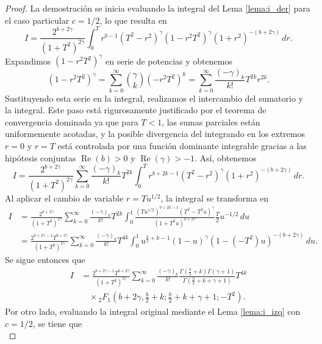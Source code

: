 \documentclass[12pt,a4paper]{book}
\begin{document}
\begin{proof}
La demostración se inicia evaluando la integral del Lema \ref{lema:i_der} para el caso particular $c = 1/2$, lo que resulta en
\[
    I = \frac{2^{b+2\gamma}}{(1+T^2)^{2\gamma}} \int_{0}^{T} r^{b-1} (T^2-r^2)^\gamma (1-r^2T^2)^\gamma (1+r^2)^{-(b+2\gamma)} \, dr.
\]
Expandimos $(1-r^2T^2)^\gamma$ en serie de potencias y obtenemos
\[
    (1-r^2T^2)^\gamma = \sum_{k=0}^{\infty} \binom{\gamma}{k} (-r^2T^2)^k = \sum_{k=0}^{\infty} \frac{(-\gamma)_k}{k!} T^{2k} r^{2k}.
\]
Sustituyendo esta serie en la integral, realizamos el intercambio del sumatorio y la integral. Este paso está rigurosamente justificado por el teorema de convergencia dominada ya que para $T < 1$, las sumas parciales están uniformemente acotadas, y la posible divergencia del integrando en los extremos $r=0$ y $r=T$ está controlada por una función dominante integrable gracias a las hipótesis conjuntas $\operatorname{Re}(b) > 0$ y $\operatorname{Re}(\gamma) > -1$. Así, obtenemos
\[
    I = \frac{2^{b+2\gamma}}{(1+T^2)^{2\gamma}} \sum_{k=0}^{\infty} \frac{(-\gamma)_k}{k!} T^{2k} \int_{0}^{T} r^{b+2k-1} (T^2-r^2)^\gamma (1+r^2)^{-(b+2\gamma)} \, dr.
\]
Al aplicar el cambio de variable $r = T u^{1/2}$, la integral se transforma en
\begin{align*}
    I &= \frac{2^{b+2\gamma}}{(1+T^2)^{2\gamma}} \sum_{k=0}^{\infty} \frac{(-\gamma)_k}{k!} T^{2k} \int_{0}^{1} \frac{\left(T u^{1/2}\right)^{b+2k-1}\left(T^2 - T^2 u\right)^\gamma}{\left(1 + T^2 u\right)^{b+2\gamma}} \frac{T}{2} u^{-1/2} \, du \\
    &= \frac{2^{b+2\gamma-1} T^{b+2\gamma}}{(1+T^2)^{2\gamma}} \sum_{k=0}^{\infty} \frac{(-\gamma)_k}{k!} T^{4k} \int_{0}^{1} u^{\frac{b}{2}+k-1} (1-u)^\gamma (1 - (-T^2)u)^{-(b+2\gamma)} \, du.
\end{align*}
Se sigue entonces que
\begin{equation}
\label{eq:thm3_der}
\begin{aligned}
     I &= \frac{2^{b+2\gamma-1} T^{b+2\gamma}}{(1+T^2)^{2\gamma}} \sum_{k=0}^{\infty} \frac{(-\gamma)_k}{k!}  \frac{\Gamma\left(\frac{b}{2}+k\right)\Gamma(\gamma+1)}{\Gamma\left(\frac{b}{2}+k+\gamma+1\right)} T^{4k} \\
     &\quad \times {}_{2}F_{1}\left(b+2\gamma, \frac{b}{2}+k; \frac{b}{2}+k+\gamma+1; -T^2\right).
\end{aligned}
\end{equation}
Por otro lado, evaluando la integral original mediante el Lema \ref{lema:i_izq} con $c = 1/2$, se tiene que
\begin{equation}

\end{equation}
\end{proof}
\end{document}
